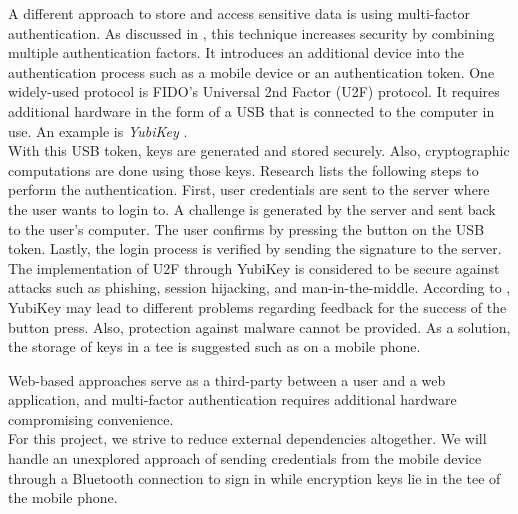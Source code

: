 A different approach to store and access sensitive data is using multi-factor authentication. As discussed in \cite{JacommeK18}, this technique increases security by combining multiple authentication factors. It introduces an additional device into the authentication process such as a mobile device or an authentication token. One widely-used protocol is FIDO's Universal 2nd Factor (U2F) protocol. It requires additional hardware in the form of a USB that is connected to the computer in use. An example is \textit{YubiKey} \cite{Yubikey}. \\
With this USB token, keys are generated and stored securely. Also, cryptographic computations are done using those keys. Research \cite{JacommeK18} lists the following steps to perform the authentication. First, user credentials are sent to the server where the user wants to login to. A challenge is generated by the server and sent back to the user's computer. The user confirms by pressing the button on the USB token. Lastly, the login process is verified by sending the signature to the server. \\
The implementation of U2F through YubiKey is considered to be secure against attacks such as phishing, session hijacking, and man-in-the-middle. According to \cite{JacommeK18}, YubiKey may lead to different problems regarding feedback for the success of the button press. Also, protection against malware cannot be provided. As a solution, the storage of keys in a \gls{tee} is suggested such as on a mobile phone.

Web-based approaches serve as a third-party between a user and a web application, and multi-factor authentication requires additional hardware compromising convenience. \\
For this project, we strive to reduce external dependencies altogether. We will handle an unexplored approach of sending credentials from the mobile device through a Bluetooth connection to sign in while encryption keys lie in the \gls{tee} of the mobile phone.
